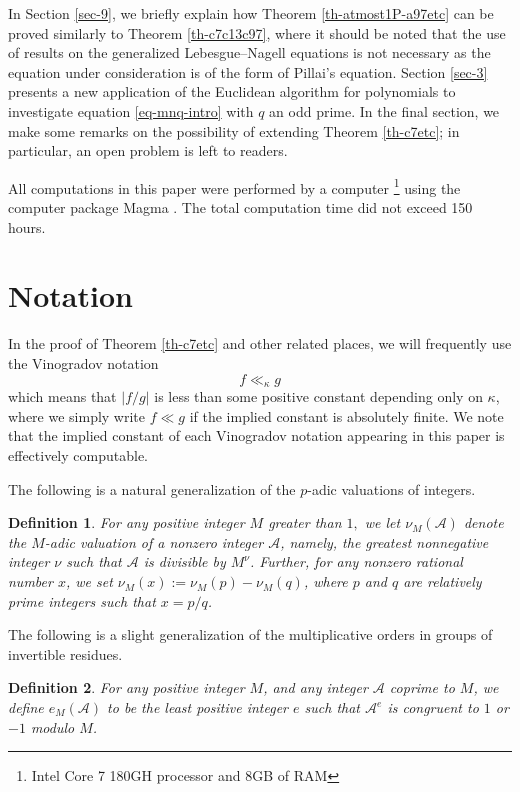 \documentclass[11pt]{amsart}
\newtheorem{definition}{Definition}[section]
\numberwithin{equation}{section}
\begin{document}
In Section \ref{sec-9}, we briefly explain how Theorem \ref{th-atmost1P-a97etc} can be proved similarly to Theorem \ref{th-c7c13c97}, where it should be noted that the use of results on the generalized Lebesgue--Nagell equations is not necessary as the equation under consideration is of the form of Pillai's equation. 
Section \ref{sec-3} presents a new application of the Euclidean algorithm for polynomials to investigate equation \eqref{eq-mnq-intro} with $q$ an odd prime.
In the final section, we make some remarks on the possibility of extending Theorem \ref{th-c7etc}; in particular, an open problem is left to readers. 

All computations in this paper were performed by a computer
\footnote{Intel Core 7 180GH processor and 8GB of RAM}
 using the computer package Magma \cite{BoCaPl}.
The total computation time did not exceed 150 hours.

\section{Notation} \label{sec-2}

In the proof of Theorem \ref{th-c7etc} and other related places, we will frequently use the Vinogradov notation 
\[
f \ll_{\kappa} g
\]
which means that $|f/g|$ is less than some positive constant depending only on $\kappa$, where we simply write $f \ll g$ if the implied constant is absolutely finite.
We note that the implied constant of each Vinogradov notation appearing in this paper is effectively computable.

The following is a natural generalization of the $p$-adic valuations of integers.

\begin{definition}\rm
For any positive integer $M$ greater than $1,$ we let $\nu_M(\mathcal A)$ denote the $M$-adic valuation of a nonzero integer $\mathcal A$, namely, the greatest nonnegative integer $\nu$ such that $\mathcal A$ is divisible by $M^\nu$.
Further, for any nonzero rational number $x$, we set $\nu_M(x):=\nu_M(p)-\nu_M(q)$, where $p$ and $q$ are relatively prime integers such that $x=p/q$.
\end{definition}

The following is a slight generalization of the multiplicative orders in groups of invertible residues. 

\begin{definition}\rm
For any positive integer $M$, and any integer $\mathcal A$ coprime to $M$, we define $e_M(\mathcal A)$ to be the least positive integer $e$ such that $\mathcal A^e$ is congruent to $1$ or $-1$ modulo $M$.
\end{definition}
\end{document}
